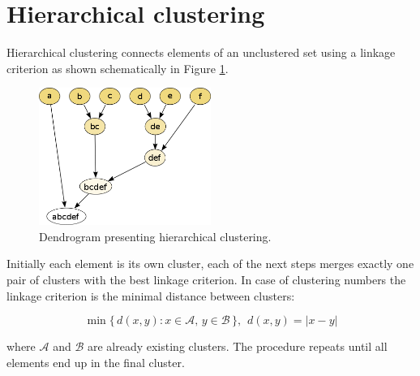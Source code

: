 
\appendix
\section{Hierarchical clustering}
\label{sec:hiercluster}

Hierarchical clustering connects elements of an unclustered set using a linkage criterion
as shown schematically in Figure \ref{fig:dendrogram}.
\begin{figure}[htbp]
\centering
\includegraphics[width=0.5\textwidth]{plots/dendrogram.png}
\caption{Dendrogram presenting hierarchical clustering. \label{fig:dendrogram}}
\end{figure}

 Initially each element is its own cluster, each of the next steps merges exactly one pair of clusters 
with the best linkage criterion. In case of clustering numbers the linkage criterion is the minimal distance 
between clusters:

\[
\min \{\, d(x,y) : x \in \mathcal{A},\, y \in \mathcal{B} \,\}, \hspace{5pt} d(x,y)=|x-y| 
\]   

where $\mathcal{A}$ and $\mathcal{B}$ are already existing clusters. The procedure repeats until all elements end up
in the final cluster.   
